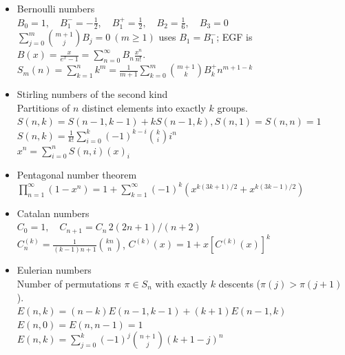 \begin{itemize}\itemsep-0.3em
\item Bernoulli numbers\\
$B_0=1,\quad B_1^-=-\frac{1}{2},\quad B_1^+=\frac{1}{2},\quad B_2=\frac{1}{6},\quad B_3=0$\\
$\displaystyle\sum_{j=0}^m\binom{m+1}{j}B_j=0\ (m\ge1)$ uses $B_1=B_1^-$; EGF is $B(x) = \frac{x}{e^x - 1}=\displaystyle\sum_{n=0}^\infty B_n\frac{x^n}{n!}$.\\
$S_m(n)=\displaystyle\sum_{k=1}^nk^m=\frac{1}{m+1}\sum_{k=0}^m\binom{m+1}{k}B^{+}_kn^{m+1-k}$
\item Stirling numbers of the second kind\\
Partitions of $n$ distinct elements into exactly $k$ groups.\\
$S(n, k) = S(n - 1, k - 1) + kS(n - 1, k), S(n, 1) = S(n, n) = 1$\\
$S(n, k) = \frac{1}{k!}\sum_{i=0}^{k}(-1)^{k-i}{k \choose i}i^n$\\
$x^n = \sum_{i=0}^{n} S(n, i) (x)_i$
\item Pentagonal number theorem\\
$\displaystyle\prod_{n=1}^{\infty}(1-x^n)=1+\sum_{k=1}^{\infty}(-1)^k\left(x^{k(3k+1)/2} + x^{k(3k-1)/2}\right)$
\item Catalan numbers\\
$C_0=1,\quad C_{n+1}=C_n\,2(2n+1)/(n+2)$\\
$C^{(k)}_n = \displaystyle \frac{1}{(k - 1)n + 1}\binom{kn}{n}$,
$C^{(k)}(x) = 1 + x [C^{(k)}(x)]^k$
\item Eulerian numbers\\
Number of permutations $\pi\in S_n$ with exactly $k$ descents ($\pi(j)>\pi(j+1)$).\\
$E(n,k) = (n-k)E(n-1,k-1) + (k+1)E(n-1,k)$\\
$E(n,0) = E(n,n-1) = 1$\\
$E(n,k) = \sum_{j=0}^k(-1)^j\binom{n+1}{j}(k+1-j)^n$
\end{itemize}
